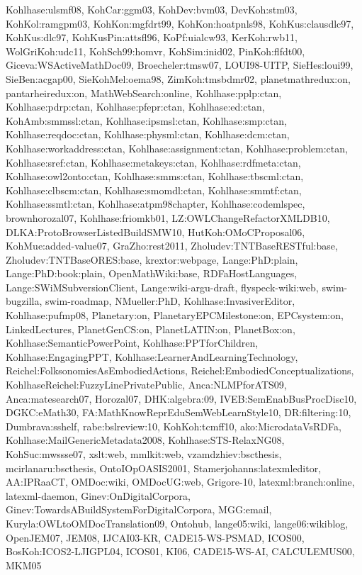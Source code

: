 {Kohlhase:ulsmf08,
KohCar:ggm03,
KohDev:bvm03,
DevKoh:stm03,
KohKol:ramgpm03,
KohKon:mgfdrt99,
KohKon:hoatpnls98,
KohKus:clausdlc97,
KohKus:dlc97,
KohKusPin:attsfl96,
KoPf:uialcw93,
KerKoh:rwb11,
WolGriKoh:udc11,
KohSch99:homvr,
KohSim:inid02,
PinKoh:flfdt00,
Giceva:WSActiveMathDoc09,
Broecheler:tmsw07,
LOUI98-UITP,
SieHes:loui99,
SieBen:acgap00,
SieKohMel:oema98,
ZimKoh:tmsbdmr02,
planetmathredux:on,
pantarheiredux:on,
MathWebSearch:online,
Kohlhase:pplp:ctan,
Kohlhase:pdrp:ctan,
Kohlhase:pfepr:ctan,
Kohlhase:ed:ctan,
KohAmb:smmssl:ctan,
Kohlhase:ipsmsl:ctan,
Kohlhase:smp:ctan,
Kohlhase:reqdoc:ctan,
Kohlhase:physml:ctan,
Kohlhase:dcm:ctan,
Kohlhase:workaddress:ctan,
Kohlhase:assignment:ctan,
Kohlhase:problem:ctan,
Kohlhase:sref:ctan,
Kohlhase:metakeys:ctan,
Kohlhase:rdfmeta:ctan,
Kohlhase:owl2onto:ctan,
Kohlhase:smms:ctan,
Kohlhase:tbscml:ctan,
Kohlhase:clbscm:ctan,
Kohlhase:smomdl:ctan,
Kohlhase:smmtf:ctan,
Kohlhase:ssmtl:ctan,
Kohlhase:atpm98chapter,
Kohlhase:codemlspec,
brownhorozal07,
Kohlhase:friomkb01,
LZ:OWLChangeRefactorXMLDB10,
DLKA:ProtoBrowserListedBuildSMW10,
HutKoh:OMoCProposal06,
KohMue:added-value07,
GraZho:rest2011,
Zholudev:TNTBaseRESTful:base,
Zholudev:TNTBaseORES:base,
krextor:webpage,
Lange:PhD:plain,
Lange:PhD:book:plain,
OpenMathWiki:base,
RDFaHostLanguages,
Lange:SWiMSubversionClient,
Lange:wiki-argu-draft,
flyspeck-wiki:web,
swim-bugzilla,
swim-roadmap,
NMueller:PhD,
Kohlhase:InvasiverEditor,
Kohlhase:pufmp08,
Planetary:on,
PlanetaryEPCMilestone:on,
EPCsystem:on,
LinkedLectures,
PlanetGenCS:on,
PlanetLATIN:on,
PlanetBox:on,
Kohlhase:SemanticPowerPoint,
Kohlhase:PPTforChildren,
Kohlhase:EngagingPPT,
Kohlhase:LearnerAndLearningTechnology,
Reichel:FolksonomiesAsEmbodiedActions,
Reichel:EmbodiedConceptualizations,
KohlhaseReichel:FuzzyLinePrivatePublic,
Anca:NLMPforATS09,
Anca:matesearch07,
Horozal07,
DHK:algebra:09,
IVEB:SemEnabBusProcDisc10,
DGKC:eMath30,
FA:MathKnowReprEduSemWebLearnStyle10,
DR:filtering:10,
Dumbrava:sshelf,
rabe:bslreview:10,
KohKoh:tcmff10,
ako:MicrodataVsRDFa,
Kohlhase:MailGenericMetadata2008,
Kohlhase:STS-RelaxNG08,
KohSuc:mwssse07,
xslt:web,
mmlkit:web,
vzamdzhiev:bscthesis,
mcirlanaru:bscthesis,
OntoIOpOASIS2001,
Stamerjohanns:latexmleditor,
AA:IPRaaCT,
OMDoc:wiki,
OMDocUG:web,
Grigore-10,
latexml:branch:online,
latexml-daemon,
Ginev:OnDigitalCorpora,
Ginev:TowardsABuildSystemForDigitalCorpora,
MGG:email,
Kuryla:OWLtoOMDocTranslation09,
Ontohub,
lange05:wiki,
lange06:wikiblog,
OpenJEM07,
JEM08,
IJCAI03-KR,
CADE15-WS-PSMAD,
ICOS00,
BosKoh:ICOS2-LJIGPL04,
ICOS01,
KI06,
CADE15-WS-AI,
CALCULEMUS00,
MKM05
}
